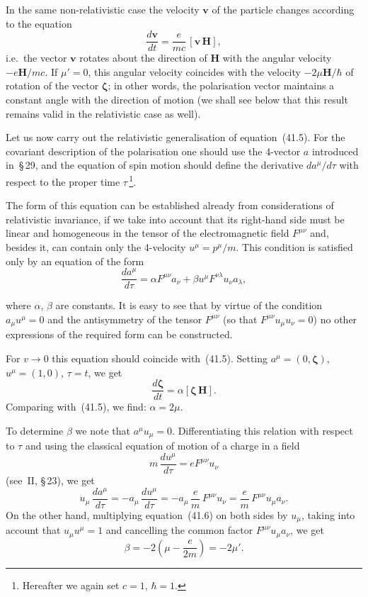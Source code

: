 In the same non-relativistic case the velocity $\mathbf{v}$ of the particle changes according to the equation
\[
\frac{d\mathbf{v}}{dt} = \frac{e}{mc}\,[\mathbf{v}\,\mathbf{H}],
\]
i.e.\ the vector $\mathbf{v}$ rotates about the direction of $\mathbf{H}$ with the angular velocity $-e\mathbf{H}/mc$. If $\mu' = 0$, this angular velocity coincides with the velocity $-2\mu\mathbf{H}/\hbar$ of rotation of the vector $\boldsymbol{\zeta}$; in other words, the polarisation vector maintains a constant angle with the direction of motion (we shall see below that this result remains valid in the relativistic case as well).

Let us now carry out the relativistic generalisation of equation~(41.5). For the covariant description of the polarisation one should use the 4-vector $a$ introduced in~\S\,29, and the equation of spin motion should define the derivative $da^\mu/d\tau$ with respect to the proper time $\tau$\,\footnote{Hereafter we again set $c = 1$, $\hbar = 1$.}.

The form of this equation can be established already from considerations of relativistic invariance, if we take into account that its right-hand side must be linear and homogeneous in the tensor of the electromagnetic field $F^{\mu\nu}$ and, besides it, can contain only the 4-velocity $u^\mu = p^\mu/m$. This condition is satisfied only by an equation of the form
\begin{equation}
\frac{da^\mu}{d\tau} = \alpha F^{\mu\nu}a_\nu + \beta u^\mu F^{\nu\lambda}u_\nu a_\lambda,
\tag{41.6}
\end{equation}

where $\alpha$, $\beta$ are constants. It is easy to see that by virtue of the condition $a_\mu u^\mu = 0$ and the antisymmetry of the tensor $F^{\mu\nu}$ (so that $F^{\mu\nu}u_\mu u_\nu = 0$) no other expressions of the required form can be constructed.

For $v\to 0$ this equation should coincide with~(41.5). Setting $a^\mu = (0,\boldsymbol{\zeta})$, $u^\mu = (1,0)$, $\tau = t$, we get
\[
\frac{d\boldsymbol{\zeta}}{dt} = \alpha[\boldsymbol{\zeta}\,\mathbf{H}].
\]
Comparing with~(41.5), we find: $\alpha = 2\mu$.

To determine $\beta$ we note that $a^\mu u_\mu = 0$. Differentiating this relation with respect to $\tau$ and using the classical equation of motion of a charge in a field
\[
m\,\frac{du^\mu}{d\tau} = eF^{\mu\nu}u_\nu
\]
(see~II, \S\,23), we get
\[
u_\mu\,\frac{da^\mu}{d\tau} = -a_\mu\,\frac{du^\mu}{d\tau} = -a_\mu\,\frac{e}{m}\,F^{\mu\nu}u_\nu = \frac{e}{m}\,F^{\mu\nu}u_\mu a_\nu.
\]
On the other hand, multiplying equation~(41.6) on both sides by $u_\mu$, taking into account that $u_\mu u^\mu = 1$ and cancelling the common factor $F^{\mu\nu}u_\mu a_\nu$, we get
\[
\beta = -2\!\left(\mu - \frac{e}{2m}\right) = -2\mu'.
\]

